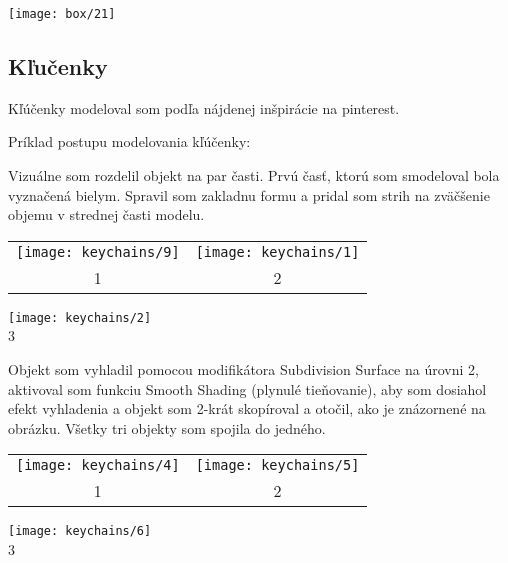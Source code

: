         \begin{center}
          \texttt{[image: box/21]}
        \end{center}
      \subsection{Kľučenky}

        Kľúčenky modeloval som podľa nájdenej inšpirácie na pinterest.

        Príklad postupu modelovania kľúčenky:

        Vizuálne som rozdelil objekt na par časti. Prvú časť, ktorú som smodeloval bola vyznačená bielym. Spravil som zakladnu formu a pridal som strih na zväčšenie objemu v strednej časti modelu. \\

        \begin{tabular}{c c}
          \texttt{[image: keychains/9]} & \texttt{[image: keychains/1]} \\
          1 & 2 \\
        \end{tabular}

        \begin{center}
          \texttt{[image: keychains/2]} \\
          3
        \end{center}

        Objekt som vyhladil pomocou modifikátora Subdivision Surface na úrovni 2, aktivoval som funkciu Smooth Shading (plynulé tieňovanie), aby som dosiahol efekt vyhladenia a objekt som 2-krát skopíroval a otočil, ako je znázornené na obrázku. Všetky tri objekty som spojila do jedného. \\
        \begin{center}
          \begin{tabular}{c c}
            \texttt{[image: keychains/4]} & \texttt{[image: keychains/5]} \\
            1 & 2 \\
          \end{tabular}
        \end{center}

        \begin{center}
          \texttt{[image: keychains/6]} \\
          3
        \end{center}

